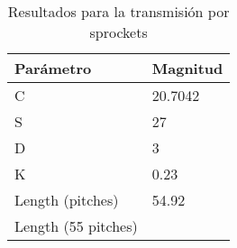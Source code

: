 \begin{table}[h]
\centering
\begin{tabular}{@{}ll@{}}
\toprule
Parámetro           & Magnitud \\ \midrule
C                   & 20.7042  \\
S                   & 27       \\
D                   & 3        \\
K                   & 0.23     \\
Length  (pitches)   & 54.92    \\
Length (55 pitches) &          \\ \bottomrule
\end{tabular}
\caption{Resultados para la transmisión por sprockets}
\label{tab:resultados_sprockets}
\end{table}
